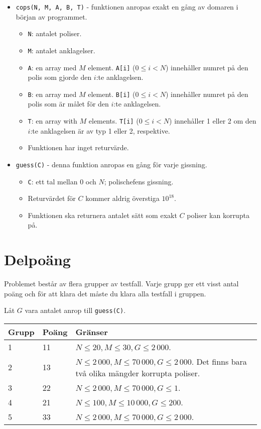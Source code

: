 \begin{itemize}
  \item \texttt{cops(N, M, A, B, T)} - funktionen anropas exakt en gång av domaren i början av programmet.
  \begin{itemize}
    \item \texttt{N}: antalet poliser.
    \item \texttt{M}: antalet anklagelser.
    \item \texttt{A}: en array med $M$ element. \texttt{A[i]} ($0 \le i < N$) innehåller numret på den polis som gjorde den $i$:te anklagelsen.
    \item \texttt{B}: en array med $M$ element. \texttt{B[i]} ($0 \le i < N$) innehåller numret på den polis som är målet för den $i$:te anklagelsen.
    \item \texttt{T}: en array with $M$ elements. \texttt{T[i]} ($0 \le i < N$) innehåller 1 eller 2 om den $i$:te anklagelsen är av typ 1 eller 2, respektive.
		\item Funktionen har inget returvärde.
  \end{itemize}
\end{itemize}

\begin{itemize}
  \item \texttt{guess(C)} - denna funktion anropas en gång för varje gissning.
  \begin{itemize}
    \item \texttt{C}: ett tal mellan $0$ och $N$; polischefens gissning.
    \item Returvärdet för $C$ kommer aldrig överstiga $10^{18}$.
		\item Funktionen ska returnera antalet sätt som exakt $C$ poliser kan korrupta på.
  \end{itemize}
\end{itemize}

\section*{Delpoäng}
Problemet består av flera grupper av testfall. Varje grupp ger ett visst antal poäng och för att klara det måste du klara alla testfall i gruppen.

Låt $G$ vara antalet anrop till \texttt{guess(C)}.

\begin{tabular}{|l|l|l|}
  \hline
  \textbf{Grupp} & \textbf{Poäng} & \textbf{Gränser} \\ \hline
  1 & 11 & $N \le 20, M \le 30, G \le 2\,000$. \\ \hline
  2 & 13 & $N \le 2\,000, M \le 70\,000, G \le 2\,000$. Det finns bara två olika mängder korrupta poliser. \\ \hline
  3 & 22 & $N \le 2\,000, M \le 70\,000, G \le 1$. \\ \hline
  4 & 21 & $N \le 100, M \le 10\,000, G \le 200$. \\ \hline
  5 & 33 & $N \le 2\,000, M \le 70\,000, G \le 2\,000$. \\ \hline
\end{tabular}

